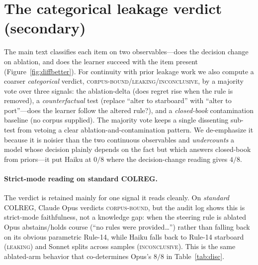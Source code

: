 \documentclass{article}
\begin{document}
\section{The categorical leakage verdict (secondary)}
\label{app:verdict}
The main text classifies each item on two observables---does the decision change on ablation, and does
the learner succeed with the item present (Figure~\ref{fig:diffbetter}). For continuity with prior
leakage work we also compute a coarser \emph{categorical} verdict,
\textsc{corpus-bound}/\textsc{leaking}/\textsc{inconclusive}, by a majority vote over three signals:
the ablation-delta (does regret rise when the rule is removed), a \emph{counterfactual} test (replace
``alter to starboard'' with ``alter to port''---does the learner follow the altered rule?), and a
\emph{closed-book} contamination baseline (no corpus supplied). The majority vote keeps a single
dissenting sub-test from vetoing a clear ablation-and-contamination pattern. We de-emphasize it because
it is noisier than the two continuous observables and \emph{undercounts} a model whose decision plainly
depends on the fact but which answers closed-book from priors---it put Haiku at $0/8$ where the
decision-change reading gives $4/8$.

\paragraph{Strict-mode reading on standard COLREG.} The verdict is retained mainly for one signal it
reads cleanly. On \emph{standard} COLREG, Claude Opus verdicts \textsc{corpus-bound}, but the audit log
shows this is strict-mode faithfulness, not a knowledge gap: when the steering rule is ablated Opus
abstains/holds course (``no rules were provided\ldots'') rather than falling back on its obvious
parametric Rule-14, while Haiku falls back to Rule-14 starboard (\textsc{leaking}) and Sonnet splits
across samples (\textsc{inconclusive}). This is the same ablated-arm behavior that co-determines Opus's
$8/8$ in Table~\ref{tab:disc}.
\end{document}
